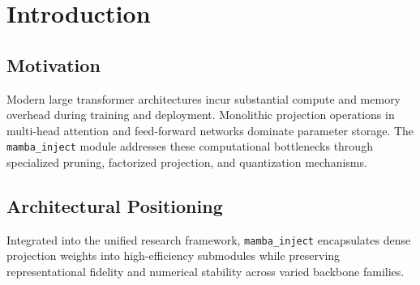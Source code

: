 \section{Introduction}

\subsection{Motivation}
Modern large transformer architectures incur substantial compute and memory overhead during training and deployment. Monolithic projection operations in multi-head attention and feed-forward networks dominate parameter storage. The \texttt{mamba_inject} module addresses these computational bottlenecks through specialized pruning, factorized projection, and quantization mechanisms.

\subsection{Architectural Positioning}
Integrated into the unified research framework, \texttt{mamba_inject} encapsulates dense projection weights into high-efficiency submodules while preserving representational fidelity and numerical stability across varied backbone families.
